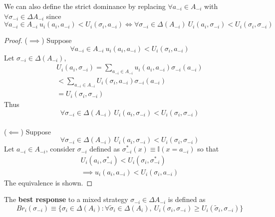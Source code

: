 \documentclass[11pt]{article}
\begin{document}
		\begin{proposition}
			We can also define the strict dominance by replacing $\forall a_{-i} \in A_{-i}$ with $\forall \sigma_{-i} \in \Delta A_{-i}$ since
			\begin{equation}
				\forall a_{-i} \in A_{-i}\ u_i(a_i, a_{-i}) < U_i(\sigma_i, a_{-i}) \iff \forall \sigma_{-i} \in \Delta(A_{-i})\ U_i(a_i, \sigma_{-i}) < U_i(\sigma_i, \sigma_{-i})
			\end{equation}
			\begin{proof}
				($\implies$) Suppose 
				\begin{equation}
					\forall a_{-i} \in A_{-i}\ u_i(a_i, a_{-i}) < U_i(\sigma_i, a_{-i})
				\end{equation}
				Let $\sigma_{-i} \in \Delta(A_{-i})$,
				\begin{gather}
					U_i(a_i, \sigma_{-i}) = \sum_{a_{-i} \in A_{-i}} u_i(a_i, a_{-i}) \sigma_{-i}(a_{-i}) \\
					< \sum_{a_{-i} \in A_{-i}} U_i(\sigma_i, a_{-i}) \sigma_{-i}(a_{-i}) \\
					= U_i(\sigma_i, \sigma_{-i})
				\end{gather}
				Thus 
				\begin{equation}
					\forall \sigma_{-i} \in \Delta(A_{-i})\ U_i(a_i, \sigma_{-i}) < U_i(\sigma_i, \sigma_{-i})
				\end{equation} \\
				($\impliedby$) Suppose
				\begin{equation}
					\forall \sigma_{-i} \in \Delta(A_{-i})\ U_i(a_i, \sigma_{-i}) < U_i(\sigma_i, \sigma_{-i})
				\end{equation}
				Let $a_{-i} \in A_{-i}$, consider $\sigma_{-i}$ defined as $\sigma^*_{-i}(x) \equiv \mathbb{I}(x = a_{-i})$
				so that
				\begin{gather}
					U_i(a_i, \sigma^*_{-i}) < U_i(\sigma_i, \sigma^*_{-i}) \\
					\implies u_i(a_i, a_{-i}) < U_i(\sigma_i, a_{-i})
				\end{gather}
				The equivalence is shown.
			\end{proof}
		\end{proposition}
		
		\begin{definition}
			The \textbf{best response} to a mixed strategy $\sigma_{-i} \in \Delta{A_{-i}}$ is defined as
			\begin{equation}
				Br_i(\sigma_{-i}) \equiv \{\sigma_i \in \Delta(A_i): 
					\forall \tilde{\sigma}_i \in \Delta(A_i),\ U_i(\sigma_i, \sigma_{-i}) \geq U_i(\tilde{\sigma}_i, \sigma_{-i})
				\}
			\end{equation}
		\end{definition}
		
\end{document}
